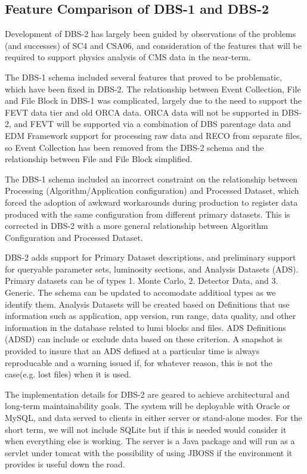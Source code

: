 \documentclass{cmspaper}
\begin{document}
\subsection{Feature Comparison of DBS-1 and DBS-2}

Development of DBS-2 has largely been guided by observations of the
problems (and successes) of SC4 and CSA06, and consideration of the
features that will be required to support physics analysis of CMS
data in the near-term.

The DBS-1 schema included several features that proved to be
problematic, which have been fixed in DBS-2.  The relationship
between Event Collection, File and File Block in DBS-1 was
complicated, largely due to the need to support the FEVT data
tier and old ORCA data.  ORCA data will not be supported in
DBS-2, and FEVT will be supported via a combination of DBS
parentage data and EDM Framework support for processing raw
data and RECO from separate files, so Event Collection has been
removed from the DBS-2 schema and the relationship between
File and File Block simplified.

The DBS-1 schema included an incorrect constraint on the
relationship between Processing (Algorithm/Application
configuration) and Processed Dataset, which forced the
adoption of awkward workarounds during production to
register data produced with the same configuration from
different primary datasets.  This is corrected in DBS-2
with a more general relationship between Algorithm Configuration
and Processed Dataset.

DBS-2 adds support for Primary Dataset descriptions,
and preliminary support for queryable parameter sets,
luminosity sections, and Analysis Datasets (ADS). Primary
datasets can be of types 1. Monte Carlo, 2. Detector Data, 
and 3. Generic. The schema can be updated to accomodate additioal 
types as we identify them. Analysis Datasets will be created based on
Definitions that use information  such as application, app version, 
run range, data quality, and other information in the database related 
to lumi blocks and files. ADS Definitions (ADSD) can include or exclude 
data based on these criterion.
A snapshot is provided to insure that an ADS defined at a particular 
time is always reproducable and a warning issued if, for whatever 
reason, this is not the case(e.g. lost files) when it is used. 

The implementation details for DBS-2 are geared to achieve 
architectural and long-term maintainability goals.  The 
system will be deployable with Oracle or MySQL, and  data 
served to clients in either server or stand-alone modes. 
For the short term, we will not include SQLite but if this 
is needed would consider it when everything else is working. 
The server is a Java package and will run as a servlet under 
tomcat with the possibility of using JBOSS if the environment 
it provides is useful down the road.   
\end{document}

